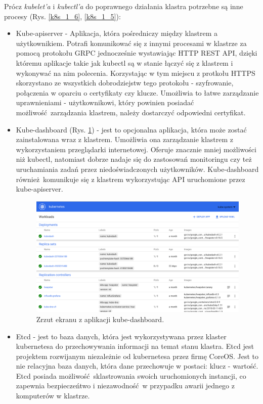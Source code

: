 \documentclass[10pt,a4paper,titlepage,twoside]{report}
\begin{document}
Prócz \textit{kubelet'a} i \textit{kubectl'a} do poprawnego działania klastra potrzebne są inne procesy (Rys. \ref{k8s_1_6}, \ref{k8s_1_5}):
\begin{itemize}
\item Kube-apiserver - Aplikacja, która pośredniczy między klastrem a użytkownikiem. Potrafi komunikować się z innymi procesami w klastrze za pomocą protokołu GRPC jednocześnie wystawiając HTTP REST API, dzięki któremu aplikacje takie jak kubectl są w stanie łączyć się z klastrem i wykonywać na nim polecenia. Korzystając w tym miejscu z protkołu HTTPS skorzystano ze wszystkich dobrodziejstw tego protokołu - szyfrowanie, połączenia w oparciu o certyfikaty czy klucze. Umożliwia to łatwe zarządzanie uprawnieniami - użytkownikowi, który powinien posiadać możliwość zarządzania klastrem, należy dostarczyć odpowiedni certyfikat.
\item Kube-dashboard (Rys. \ref{k8s_dash}) - jest to opcjonalna aplikacja, która może zostać zainstalowana wraz z klastrem. Umożliwia ona zarządzanie klastrem z wykorzystaniem przeglądarki internetowej. Oferuje znacznie mniej możliwości niż kubectl, natomiast dobrze nadaje się do zastosowań monitoringu czy też uruchamiania zadań przez niedoświadczonych użytkowników. Kube-dashboard również komunikuje się z klastrem wykorzystując API uruchomione przez kube-apiserver.
\begin{figure}[!h]
	\centering
	\includegraphics[scale=0.17]{pics/kubedash.png}
	\caption{Zrzut ekranu z aplikacji kube-dashboard.}
	\label{k8s_dash}
\end{figure}
\item Etcd \cite{ad37} - jest to baza danych, która jest wykorzystywana przez klaster kubernetesa do przechowywania informacji na temat stanu klastra. Etcd jest projektem rozwijanym niezależnie od kubernetesa przez firmę CoreOS. Jest to nie relacyjna baza danych, która dane przechowuje w postaci: klucz - wartość. Etcd posiada możliwość sklastrowania swoich uruchomionych instancji, co zapewnia bezpieczeńtwo i niezawodność w przypadku awarii jednego z komputerów w klastrze.

\end{itemize}
\end{document}
